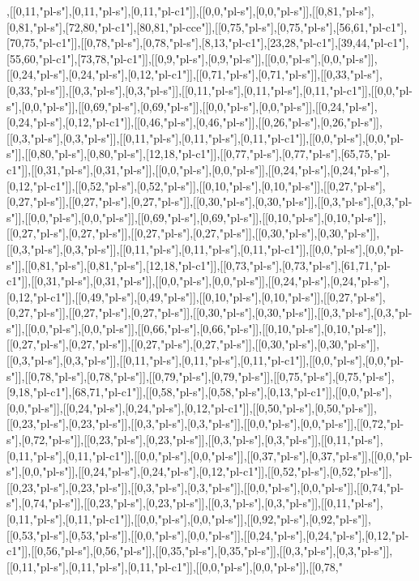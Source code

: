 ,[[0,11,"pl-s"],[0,11,"pl-s"],[0,11,"pl-c1"]],[[0,0,"pl-s"],[0,0,"pl-s"]],[[0,81,"pl-s"],[0,81,"pl-s"],[72,80,"pl-c1"],[80,81,"pl-cce"]],[[0,75,"pl-s"],[0,75,"pl-s"],[56,61,"pl-c1"],[70,75,"pl-c1"]],[[0,78,"pl-s"],[0,78,"pl-s"],[8,13,"pl-c1"],[23,28,"pl-c1"],[39,44,"pl-c1"],[55,60,"pl-c1"],[73,78,"pl-c1"]],[[0,9,"pl-s"],[0,9,"pl-s"]],[[0,0,"pl-s"],[0,0,"pl-s"]],[[0,24,"pl-s"],[0,24,"pl-s"],[0,12,"pl-c1"]],[[0,71,"pl-s"],[0,71,"pl-s"]],[[0,33,"pl-s"],[0,33,"pl-s"]],[[0,3,"pl-s"],[0,3,"pl-s"]],[[0,11,"pl-s"],[0,11,"pl-s"],[0,11,"pl-c1"]],[[0,0,"pl-s"],[0,0,"pl-s"]],[[0,69,"pl-s"],[0,69,"pl-s"]],[[0,0,"pl-s"],[0,0,"pl-s"]],[[0,24,"pl-s"],[0,24,"pl-s"],[0,12,"pl-c1"]],[[0,46,"pl-s"],[0,46,"pl-s"]],[[0,26,"pl-s"],[0,26,"pl-s"]],[[0,3,"pl-s"],[0,3,"pl-s"]],[[0,11,"pl-s"],[0,11,"pl-s"],[0,11,"pl-c1"]],[[0,0,"pl-s"],[0,0,"pl-s"]],[[0,80,"pl-s"],[0,80,"pl-s"],[12,18,"pl-c1"]],[[0,77,"pl-s"],[0,77,"pl-s"],[65,75,"pl-c1"]],[[0,31,"pl-s"],[0,31,"pl-s"]],[[0,0,"pl-s"],[0,0,"pl-s"]],[[0,24,"pl-s"],[0,24,"pl-s"],[0,12,"pl-c1"]],[[0,52,"pl-s"],[0,52,"pl-s"]],[[0,10,"pl-s"],[0,10,"pl-s"]],[[0,27,"pl-s"],[0,27,"pl-s"]],[[0,27,"pl-s"],[0,27,"pl-s"]],[[0,30,"pl-s"],[0,30,"pl-s"]],[[0,3,"pl-s"],[0,3,"pl-s"]],[[0,0,"pl-s"],[0,0,"pl-s"]],[[0,69,"pl-s"],[0,69,"pl-s"]],[[0,10,"pl-s"],[0,10,"pl-s"]],[[0,27,"pl-s"],[0,27,"pl-s"]],[[0,27,"pl-s"],[0,27,"pl-s"]],[[0,30,"pl-s"],[0,30,"pl-s"]],[[0,3,"pl-s"],[0,3,"pl-s"]],[[0,11,"pl-s"],[0,11,"pl-s"],[0,11,"pl-c1"]],[[0,0,"pl-s"],[0,0,"pl-s"]],[[0,81,"pl-s"],[0,81,"pl-s"],[12,18,"pl-c1"]],[[0,73,"pl-s"],[0,73,"pl-s"],[61,71,"pl-c1"]],[[0,31,"pl-s"],[0,31,"pl-s"]],[[0,0,"pl-s"],[0,0,"pl-s"]],[[0,24,"pl-s"],[0,24,"pl-s"],[0,12,"pl-c1"]],[[0,49,"pl-s"],[0,49,"pl-s"]],[[0,10,"pl-s"],[0,10,"pl-s"]],[[0,27,"pl-s"],[0,27,"pl-s"]],[[0,27,"pl-s"],[0,27,"pl-s"]],[[0,30,"pl-s"],[0,30,"pl-s"]],[[0,3,"pl-s"],[0,3,"pl-s"]],[[0,0,"pl-s"],[0,0,"pl-s"]],[[0,66,"pl-s"],[0,66,"pl-s"]],[[0,10,"pl-s"],[0,10,"pl-s"]],[[0,27,"pl-s"],[0,27,"pl-s"]],[[0,27,"pl-s"],[0,27,"pl-s"]],[[0,30,"pl-s"],[0,30,"pl-s"]],[[0,3,"pl-s"],[0,3,"pl-s"]],[[0,11,"pl-s"],[0,11,"pl-s"],[0,11,"pl-c1"]],[[0,0,"pl-s"],[0,0,"pl-s"]],[[0,78,"pl-s"],[0,78,"pl-s"]],[[0,79,"pl-s"],[0,79,"pl-s"]],[[0,75,"pl-s"],[0,75,"pl-s"],[9,18,"pl-c1"],[68,71,"pl-c1"]],[[0,58,"pl-s"],[0,58,"pl-s"],[0,13,"pl-c1"]],[[0,0,"pl-s"],[0,0,"pl-s"]],[[0,24,"pl-s"],[0,24,"pl-s"],[0,12,"pl-c1"]],[[0,50,"pl-s"],[0,50,"pl-s"]],[[0,23,"pl-s"],[0,23,"pl-s"]],[[0,3,"pl-s"],[0,3,"pl-s"]],[[0,0,"pl-s"],[0,0,"pl-s"]],[[0,72,"pl-s"],[0,72,"pl-s"]],[[0,23,"pl-s"],[0,23,"pl-s"]],[[0,3,"pl-s"],[0,3,"pl-s"]],[[0,11,"pl-s"],[0,11,"pl-s"],[0,11,"pl-c1"]],[[0,0,"pl-s"],[0,0,"pl-s"]],[[0,37,"pl-s"],[0,37,"pl-s"]],[[0,0,"pl-s"],[0,0,"pl-s"]],[[0,24,"pl-s"],[0,24,"pl-s"],[0,12,"pl-c1"]],[[0,52,"pl-s"],[0,52,"pl-s"]],[[0,23,"pl-s"],[0,23,"pl-s"]],[[0,3,"pl-s"],[0,3,"pl-s"]],[[0,0,"pl-s"],[0,0,"pl-s"]],[[0,74,"pl-s"],[0,74,"pl-s"]],[[0,23,"pl-s"],[0,23,"pl-s"]],[[0,3,"pl-s"],[0,3,"pl-s"]],[[0,11,"pl-s"],[0,11,"pl-s"],[0,11,"pl-c1"]],[[0,0,"pl-s"],[0,0,"pl-s"]],[[0,92,"pl-s"],[0,92,"pl-s"]],[[0,53,"pl-s"],[0,53,"pl-s"]],[[0,0,"pl-s"],[0,0,"pl-s"]],[[0,24,"pl-s"],[0,24,"pl-s"],[0,12,"pl-c1"]],[[0,56,"pl-s"],[0,56,"pl-s"]],[[0,35,"pl-s"],[0,35,"pl-s"]],[[0,3,"pl-s"],[0,3,"pl-s"]],[[0,11,"pl-s"],[0,11,"pl-s"],[0,11,"pl-c1"]],[[0,0,"pl-s"],[0,0,"pl-s"]],[[0,78,"